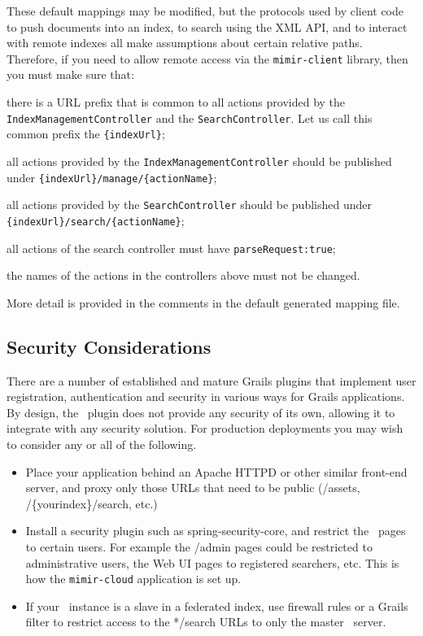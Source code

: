 These default mappings may be modified, but the protocols used by client
code to push documents into an index, to search using the XML API, and to
interact with remote indexes all make assumptions about certain relative paths.
Therefore, if you need to allow remote access via the {\tt mimir-client}
library, then you must make sure that:

\bit
\item there is a URL prefix that is common to all actions provided by the
  {\tt IndexManagementController} and the {\tt SearchController}. Let us call
  this common prefix the {\tt \{indexUrl\}};
\item all actions provided by the {\tt IndexManagementController} should be
  published under {\tt \{indexUrl\}/manage/\{actionName\}};
\item all actions provided by the {\tt SearchController} should be
  published under {\tt \{indexUrl\}/search/\{actionName\}};
\item all actions of the search controller must have {\tt parseRequest:true}; 
\item the names of the actions in the controllers above must not be changed.
\eit 

More detail is provided in the comments in the default generated mapping file.

\subsection{Security Considerations}

There are a number of established and mature Grails plugins that implement user
registration, authentication and security in various ways for Grails
applications.  By design, the \Mimir\ plugin does not provide any
security of its own, allowing it to integrate with any security solution. For
production deployments you may wish to consider any or all of the following.

\begin{itemize}
\item Place your application behind an Apache HTTPD or other similar front-end
  server, and proxy only those URLs that need to be public (/assets,
  /\{yourindex\}/search, etc.)
\item Install a security plugin such as spring-security-core, and
  restrict the \Mimir\ pages to certain users.  For example the /admin pages
  could be restricted to administrative users, the Web UI pages to registered
  searchers, etc.  This is how the {\tt mimir-cloud} application is set up.
\item If your \Mimir\ instance is a slave in a federated index, use firewall
  rules or a Grails filter to restrict access to the */search URLs to only the
  master \Mimir\ server.
\end{itemize}

